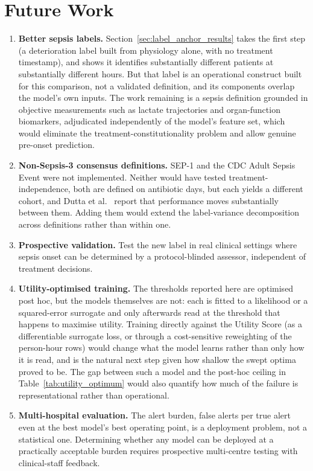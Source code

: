 \section{Future Work}

\begin{enumerate}
    \item \textbf{Better sepsis labels.} Section~\ref{sec:label_anchor_results}
    takes the first step (a deterioration label built from physiology alone,
    with no treatment timestamp), and shows it identifies substantially
    different patients at substantially different hours. But that label is an
    operational construct built for this comparison, not a validated definition,
    and its components overlap the model's own inputs. The work remaining is a
    sepsis definition grounded in objective measurements such as lactate
    trajectories and organ-function biomarkers, adjudicated independently of the
    model's feature set, which would eliminate the treatment-constitutionality
    problem and allow genuine pre-onset prediction.

    \item \textbf{Non-Sepsis-3 consensus definitions.} SEP-1 and the CDC Adult
    Sepsis Event were not implemented. Neither would have tested
    treatment-independence, both are defined on antibiotic days, but each
    yields a different cohort, and Dutta et al.\ \cite{dutta2026performance}
    report that performance moves substantially between them. Adding them would
    extend the label-variance decomposition across definitions rather than
    within one.

    \item \textbf{Prospective validation.} Test the new label in real clinical
    settings where sepsis onset can be determined by a protocol-blinded assessor,
    independent of treatment decisions.

    \item \textbf{Utility-optimised training.} The thresholds reported here are
    optimised post hoc, but the models themselves are not: each is fitted to a
    likelihood or a squared-error surrogate and only afterwards read at the
    threshold that happens to maximise utility. Training directly against the
    Utility Score (as a differentiable surrogate loss, or through a
    cost-sensitive reweighting of the person-hour rows) would change what the
    model learns rather than only how it is read, and is the natural next step
    given how shallow the swept optima proved to be. The gap between such a
    model and the post-hoc ceiling in Table~\ref{tab:utility_optimum} would also
    quantify how much of the failure is representational rather than
    operational.

    \item \textbf{Multi-hospital evaluation.} The alert burden, \pcUtilityOptBurdenGbtB{} false alerts per true alert even at the best
    model's best operating point, is a deployment problem, not a statistical
    one. Determining whether any model can be deployed at a practically
    acceptable burden requires prospective multi-centre testing with
    clinical-staff feedback.
\end{enumerate}


